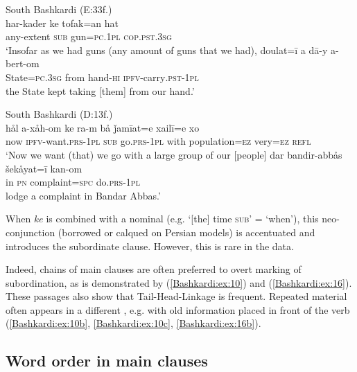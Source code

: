\documentclass[output=paper,colorlinks,citecolor=brown]{langscibook}
\begin{document}
\ea\label{Bashkardi:ex:12}
South Bashkardi (E:33f.) \\
\ea\label{Bashkardi:ex:12a}
\gll har-kader ke tofak=an hat \\
any-extent \textsc{sub} gun\textsc{=pc.1pl} \textsc{cop.pst.3sg} \\
\glt `Insofar as we had guns (any amount of guns that we had),
\ex\label{Bashkardi:ex:12b}
\gll doulat=ī a dā-y a-bert-om \\
State\textsc{=pc.3sg} from hand\textsc{-hi} \textsc{ipfv-}carry\textsc{.pst}\textsc{-1pl} \\
\glt the State kept taking [them] from our hand.'
\z
\z

\ea\label{Bashkardi:ex:13}
South Bashkardi (D:13f.) \\
\ea\label{Bashkardi:ex:13a}
\gll hål a-xåh-om {\hspace{7cm}} ke ra-m bå ǰamīat=e xailī=e xo \\
now \textsc{ipfv-}want\textsc{.prs}\textsc{-1pl} {} \textsc{sub} go\textsc{.prs}\textsc{-1pl} with population\textsc{=ez} very\textsc{=ez} \textsc{refl} \\
\glt `Now we want (that) we go with a large group of our [people]
\ex\label{Bashkardi:ex:13b}
\gll dar bandir-abbås šekåyat=ī kan-om \\
in \textsc{pn} complaint\textsc{=spc} do\textsc{.prs}\textsc{-1pl} \\
\glt [and] lodge a complaint in Bandar Abbas.'
\z
\z

When \textit{ke} is combined with a nominal (e.g. `[the] time \textsc{sub}' = `when'), this neo-{conjunction} (borrowed or calqued on Persian models) is accentuated and introduces the subordinate clause. However, this is rare in the data.

Indeed, {chains of main clauses} are often preferred to overt marking of subordination, as is demonstrated by (\ref{Bashkardi:ex:10}) and (\ref{Bashkardi:ex:16}). These passages also show that Tail-Head-Linkage is frequent. Repeated material often appears in a different , e.g. with old information placed in front of the verb (\ref{Bashkardi:ex:10b}, \ref{Bashkardi:ex:10c}, \ref{Bashkardi:ex:16b}).

\subsection{Word order in main clauses}\label{Bashkardi:ss:2.4}
\end{document}
